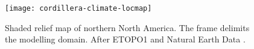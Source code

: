 
\introduction
\label{sec:intro}

\begin{figure}[t]
	\vspace*{2mm}
	\begin{center}
		\texttt{[image: cordillera-climate-locmap]}
	\end{center}
	\caption{Shaded relief map of northern North America. The frame delimits the modelling domain. After ETOPO1 \citep{data:etopo1} and Natural Earth Data \citep{data:naturalearth}.}
	\label{fig:locmap}
\end{figure}


